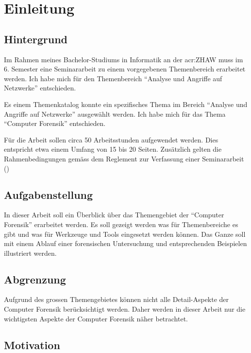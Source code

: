 
\chapter{Einleitung}

\section{Hintergrund}
Im Rahmen meines Bachelor-Studiums in Informatik an der \gls{acr:ZHAW} muss im 6. Semester eine Seminararbeit zu einem vorgegebenen Themenbereich erarbeitet werden. Ich habe mich für den Themenbereich "`Analyse und Angriffe auf Netzwerke"' entschieden.

Es einem Themenkatalog konnte ein spezifisches Thema im Bereich "`Analyse und Angriffe auf Netzwerke"' ausgewählt werden. Ich habe mich für das Thema "`Computer Forensik"' entschieden.

Für die Arbeit sollen circa 50 Arbeitsstunden aufgewendet werden. Dies entspricht etwa einem Umfang von 15 bis 20 Seiten. Zusätzlich gelten die Rahmenbedingungen gemäss dem Reglement zur Verfassung einer Seminararbeit (\cite{ZHAW:2012:Seminararbeit:Reglemente})

\section{Aufgabenstellung}
In dieser Arbeit soll ein Überblick über das Themengebiet der "`Computer Forensik"' erarbeitet werden. Es soll gezeigt werden was für Themenbereiche es gibt und was für Werkzeuge und Tools eingesetzt werden können. Das Ganze soll mit einem Ablauf einer forensischen Untersuchung und entsprechenden Beispielen illustriert werden.

\section{Abgrenzung}
Aufgrund des grossen Themengebietes können nicht alle Detail-Aspekte der Computer Forensik berücksichtigt werden. Daher werden in dieser Arbeit nur die wichtigsten Aspekte der Computer Forensik näher betrachtet.


\section{Motivation}

